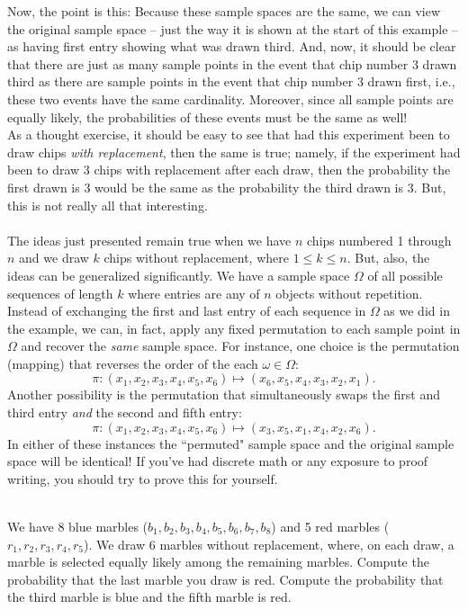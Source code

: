 \documentclass[12pt]{article}
\begin{document}
\noindent Now, the point is this: Because these sample spaces are the same, we can view the original sample space -- just the way it is shown at the start of this example -- as having first entry showing what was drawn third.  And, now, it should be clear that there are just as many sample points in the event that chip number 3
drawn third as there are sample points in the
event that chip number 3 drawn first, i.e., these two events have the same cardinality. Moreover, since
all sample points are equally likely, the probabilities of these events must be the same as well!\\

\noindent As a thought exercise, it should be easy to see that had this experiment been to draw chips {\em with replacement}, then the same is true; namely,
if the experiment had been to draw 3 chips with replacement after each draw, then the probability the first drawn is 3 would be the same as the probability the third drawn is 3.
But, this is not really all that interesting.\\


\\
The ideas just presented remain true when we have $n$ chips numbered 1 through $n$ and we draw $k$ chips without replacement,
where $1\le k\le n$.  But, also, the ideas can be generalized significantly.  We have a sample space $\Omega$ of all possible
sequences of length $k$ where entries are any of $n$ objects without repetition.
Instead of exchanging the first and last entry of each sequence in $\Omega$ as we did in the example,
we can, in fact, apply any fixed permutation to each sample point in $\Omega$ and recover the {\em same} sample space.
For instance, one choice is the permutation (mapping) that reverses the order of the each $\omega\in \Omega$:
$$\pi : (x_1,x_2,x_3,x_4,x_5,x_6) \mapsto (x_6,x_5,x_4,x_3,x_2,x_1).$$
Another possibility is the permutation that simultaneously swaps the first and third entry {\em and} the second and fifth entry:
$$\pi : (x_1,x_2,x_3,x_4,x_5,x_6) \mapsto (x_3,x_5,x_1,x_4,x_2,x_6).$$
In either of these instances the ``permuted" sample space and the original sample space will be identical!  If you've had discrete math or any exposure to proof writing, you should try to prove this for yourself.



\newpage

\\
We have 8 blue marbles ($b_1,b_2,b_3,b_4,b_5,b_6,b_7,b_8$) and 5 red marbles ($r_1,r_2,r_3,r_4,r_5$). We draw
6 marbles without replacement, where, on each draw, a marble is selected equally likely among the remaining marbles.
Compute the probability that the last marble you draw is red.  Compute the probability that the third marble is blue and the fifth marble is red.\\
\end{document}
